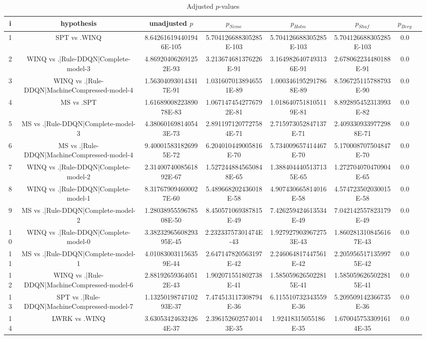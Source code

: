 \documentclass[a3paper,10pt]{article}
\begin{document}
\begin{table}[!htp]
\centering\tiny
\caption{Adjusted $p$-values}
\begin{tabular}{cccccccc}
i&hypothesis&unadjusted $p$&$p_{Neme}$&$p_{Holm}$&$p_{Shaf}$&$p_{Berg}$\\
\hline
1&SPT vs .WINQ&8.642616194401946E-105&5.704126688305285E-103&5.704126688305285E-103&5.704126688305285E-103&0.0\\
2&WINQ vs .|Rule-DDQN|Complete-model-3&4.869204062691252E-93&3.213674681376226E-91&3.1649826407493136E-91&2.678062234480188E-91&0.0\\
3&WINQ vs .|Rule-DDQN|MachineCompressed-model-4&1.563040930143417E-91&1.0316070138946551E-89&1.0003461952917868E-89&8.596725115788793E-90&0.0\\
4&MS vs .SPT&1.6168900822389078E-83&1.0671474542776792E-81&1.0186407518105119E-81&8.892895452313993E-82&0.0\\
5&MS vs .|Rule-DDQN|Complete-model-3&4.380601698140543E-73&2.8911971207727584E-71&2.715973052847137E-71&2.4093309339772988E-71&0.0\\
6&MS vs .|Rule-DDQN|MachineCompressed-model-4&9.400015831826995E-72&6.204010449005816E-70&5.734009657414467E-70&5.170008707504847E-70&0.0\\
7&WINQ vs .|Rule-DDQN|Complete-model-2&2.3140074008561892E-67&1.5272448845650848E-65&1.3884044405137135E-65&1.272704070470904E-65&0.0\\
8&WINQ vs .|Rule-DDQN|Complete-model-1&8.317679094600027E-60&5.489668202436018E-58&4.907430665814016E-58&4.574723502030015E-58&0.0\\
9&MS vs .|Rule-DDQN|Complete-model-2&1.2803895559678508E-50&8.450571069387815E-49&7.426259424613534E-49&7.042142557823179E-49&0.0\\
10&WINQ vs .|Rule-DDQN|Complete-model-0&3.3823296560829395E-45&2.23233757301474E-43&1.9279279039672753E-43&1.8602813108456167E-43&0.0\\
11&MS vs .|Rule-DDQN|Complete-model-1&4.010830031156359E-44&2.647147820563197E-42&2.246064817447561E-42&2.2059565171359975E-42&0.0\\
12&WINQ vs .|Rule-DDQN|MachineCompressed-model-6&2.881926593640512E-43&1.902071551802738E-41&1.5850596265022815E-41&1.5850596265022815E-41&0.0\\
13&SPT vs .|Rule-DDQN|MachineCompressed-model-7&1.1325019874710293E-37&7.474513117308794E-36&6.115510732343559E-36&5.209509142366735E-36&0.0\\
14&LWRK vs .WINQ&3.630534246324264E-37&2.3961526025740143E-35&1.92418315055186E-35&1.6700457533091614E-35&0.0\\

\end{tabular}
\end{table}
\end{document}
